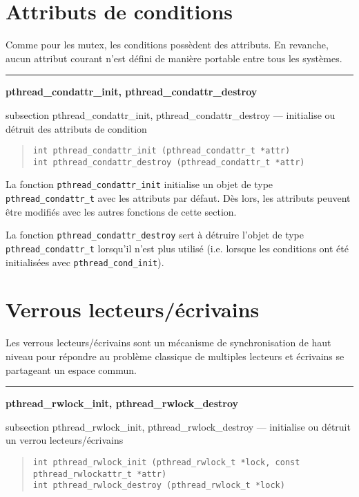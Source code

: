 \documentclass [twoside] {report}
\newcommand {\primitive} [1]
    {
	{\large \bf #1}
	\addcontentsline {toc} {subsection} {#1}
    }
\newcommand {\separation}
    {
	\vspace {7mm}
	\nopagebreak
	\hrule
    }
\begin{document}
\section {Attributs de conditions}

Comme pour les mutex, les conditions possèdent des attributs. En
revanche, aucun attribut courant n'est défini de manière portable
entre tous les systèmes.


\separation
\primitive {pthread\_condattr\_init, pthread\_condattr\_destroy} --- initialise ou détruit des attributs de condition

\begin {quote}
\begin {verbatim}
int pthread_condattr_init (pthread_condattr_t *attr)
int pthread_condattr_destroy (pthread_condattr_t *attr)
\end{verbatim}
\end {quote}

La fonction \verb|pthread_condattr_init| initialise un objet de type
\verb|pthread_condattr_t| avec les attributs par défaut. Dès lors,
les attributs peuvent être modifiés avec les autres fonctions de
cette section.

La fonction \verb|pthread_condattr_destroy| sert à détruire
l'objet de type \verb|pthread_condattr_t| lorsqu'il n'est plus
utilisé (i.e.  lorsque les conditions ont été initialisées avec
\verb|pthread_cond_init|).


\section {Verrous lecteurs/écrivains}

Les verrous lecteurs/écrivains sont un mécanisme de synchronisation de
haut niveau pour répondre au problème classique de multiples lecteurs
et écrivains se partageant un espace commun.

\separation
\primitive {pthread\_rwlock\_init, pthread\_rwlock\_destroy} --- initialise ou détruit un verrou lecteurs/écrivains

\begin {quote}
\begin {verbatim}
int pthread_rwlock_init (pthread_rwlock_t *lock, const pthread_rwlockattr_t *attr)
int pthread_rwlock_destroy (pthread_rwlock_t *lock)
\end{verbatim}
\end {quote}
\end{document}
